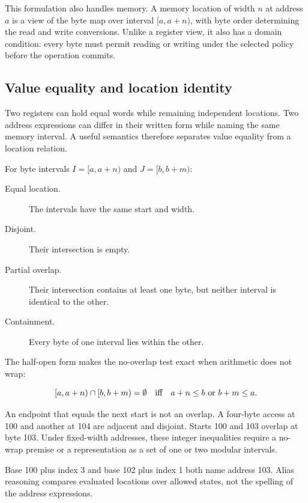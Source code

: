This formulation also handles memory. A memory location of width \(n\) at
address \(a\) is a view of the byte map over interval \([a,a+n)\), with byte
order determining the read and write conversions. Unlike a register view, it
also has a domain condition: every byte must permit reading or writing under the
selected policy before the operation commits.

\subsection{Value equality and location identity}

Two registers can hold equal words while remaining independent locations. Two
address expressions can differ in their written form while naming the same memory
interval. A useful semantics therefore separates value equality from a
location relation.

For byte intervals \(I=[a,a+n)\) and \(J=[b,b+m)\):

\begin{description}
\item[Equal location.] The intervals have the same start and width.
\item[Disjoint.] Their intersection is empty.
\item[Partial overlap.] Their intersection contains at least one byte, but neither interval
is identical to the other.
\item[Containment.] Every byte of one interval lies within the other.
\end{description}

The half-open form makes the no-overlap test exact when arithmetic does not
wrap:

\[
  [a,a+n)\cap[b,b+m)=\emptyset
  \quad\hbox{iff}\quad
  a+n\leq b\ \hbox{or}\ b+m\leq a.
\]

An endpoint that equals the next start is not an overlap. A four-byte access at
100 and another at 104 are adjacent and disjoint. Starts 100 and 103 overlap
at byte 103. Under fixed-width addresses, these integer inequalities require
a no-wrap premise or a representation as a set of one or two modular
intervals.

\begin{warning}[title={Different expressions do not prove different bytes}]
Base 100 plus index 3 and base 102 plus index 1 both name address 103. Alias
reasoning compares evaluated locations over allowed states, not the spelling
of the address expressions.
\end{warning}

